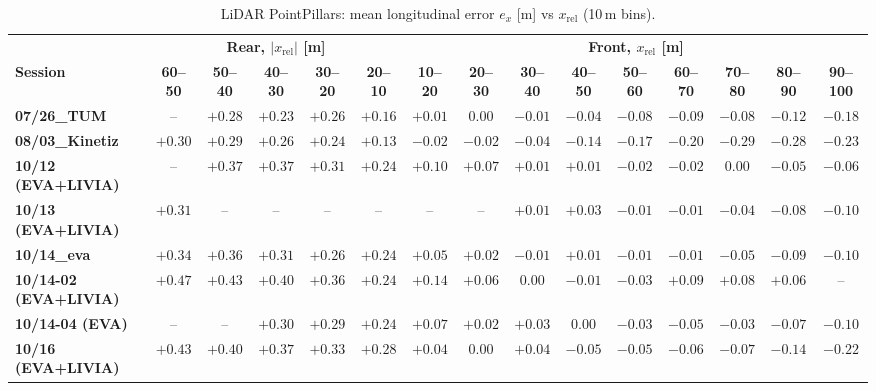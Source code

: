 \begin{landscape}
\begin{table}[H]
\centering
\setlength{\tabcolsep}{2.6pt}\small\renewcommand{\arraystretch}{0.85}
\begin{tabular}{|lccccc|ccccccccc|}
\hline
 \rowcolor{bluepoli!40} &\multicolumn{5}{c|}{\textbf{Rear, $|x_{\mathrm{rel}}|$ [m]}}&\multicolumn{9}{c|}{\textbf{Front, $x_{\mathrm{rel}}$ [m]}} \\
\rowcolor{bluepoli!40} \textbf{Session} & \textbf{60--50} & \textbf{50--40} & \textbf{40--30} & \textbf{30--20} & \textbf{20--10} & \textbf{10--20} & \textbf{20--30} & \textbf{30--40} & \textbf{40--50} & \textbf{50--60} & \textbf{60--70} & \textbf{70--80} & \textbf{80--90} & \textbf{90--100} \\
\hline\hline
\textbf{07/26\_TUM} & -- & $+0.28$ & $+0.23$ & $+0.26$ & $+0.16$ & $+0.01$ & $0.00$ & $-0.01$ & $-0.04$ & $-0.08$ & $-0.09$ & $-0.08$ & $-0.12$ & $-0.18$ \\
\textbf{08/03\_Kinetiz} & $+0.30$ & $+0.29$ & $+0.26$ & $+0.24$ & $+0.13$ & $-0.02$ & $-0.02$ & $-0.04$ & $-0.14$ & $-0.17$ & $-0.20$ & $-0.29$ & $-0.28$ & $-0.23$ \\
\textbf{10/12 (EVA+LIVIA)} & -- & $+0.37$ & $+0.37$ & $+0.31$ & $+0.24$ & $+0.10$ & $+0.07$ & $+0.01$ & $+0.01$ & $-0.02$ & $-0.02$ & $0.00$ & $-0.05$ & $-0.06$ \\
\textbf{10/13 (EVA+LIVIA)} & $+0.31$ & -- & -- & -- & -- & -- & -- & $+0.01$ & $+0.03$ & $-0.01$ & $-0.01$ & $-0.04$ & $-0.08$ & $-0.10$ \\
\textbf{10/14\_eva} & $+0.34$ & $+0.36$ & $+0.31$ & $+0.26$ & $+0.24$ & $+0.05$ & $+0.02$ & $-0.01$ & $+0.01$ & $-0.01$ & $-0.01$ & $-0.05$ & $-0.09$ & $-0.10$ \\
\textbf{10/14-02 (EVA+LIVIA)} & $+0.47$ & $+0.43$ & $+0.40$ & $+0.36$ & $+0.24$ & $+0.14$ & $+0.06$ & $0.00$ & $-0.01$ & $-0.03$ & $+0.09$ & $+0.08$ & $+0.06$ & -- \\
\textbf{10/14-04 (EVA)} & -- & -- & $+0.30$ & $+0.29$ & $+0.24$ & $+0.07$ & $+0.02$ & $+0.03$ & $0.00$ & $-0.03$ & $-0.05$ & $-0.03$ & $-0.07$ & $-0.10$ \\
\textbf{10/16 (EVA+LIVIA)} & $+0.43$ & $+0.40$ & $+0.37$ & $+0.33$ & $+0.28$ & $+0.04$ & $0.00$ & $+0.04$ & $-0.05$ & $-0.05$ & $-0.06$ & $-0.07$ & $-0.14$ & $-0.22$ \\
\hline
\end{tabular}
\caption{LiDAR PointPillars: mean longitudinal error $e_x$ [m] vs $x_{\mathrm{rel}}$ (10\,m bins).}
\label{tab:pp_ex}
\end{table}


\end{landscape}
